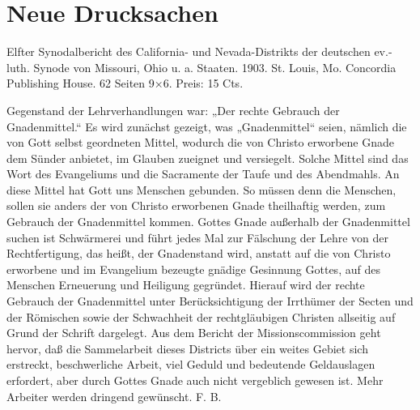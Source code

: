 \chapter{Neue Drucksachen}

Elfter Synodalbericht des California- und Nevada-Distrikts der deutschen ev.-luth. Synode von Missouri, Ohio u. a. Staaten. 1903. St. Louis, Mo. Concordia Publishing House. 62 Seiten 9×6. Preis: 15 Cts.

Gegenstand der Lehrverhandlungen war: „Der rechte Gebrauch der Gnadenmittel.“ Es wird zunächst gezeigt, was „Gnadenmittel“ seien, nämlich die von Gott selbst geordneten Mittel, wodurch die von Christo erworbene Gnade dem Sünder anbietet, im Glauben zueignet und versiegelt. Solche Mittel sind das Wort des Evangeliums und die Sacramente der Taufe und des Abendmahls. An diese Mittel hat Gott uns Menschen gebunden. So müssen denn die Menschen, sollen sie anders der von Christo erworbenen Gnade theilhaftig werden, zum Gebrauch der Gnadenmittel kommen. Gottes Gnade außerhalb der Gnadenmittel suchen ist Schwärmerei und führt jedes Mal zur Fälschung der Lehre von der Rechtfertigung, das heißt, der Gnadenstand wird, anstatt auf die von Christo erworbene und im Evangelium bezeugte gnädige Gesinnung Gottes, auf des Menschen Erneuerung und Heiligung gegründet. Hierauf wird der rechte Gebrauch der Gnadenmittel unter Berücksichtigung der Irrthümer der Secten und der Römischen sowie der Schwachheit der rechtgläubigen Christen allseitig auf Grund der Schrift dargelegt. Aus dem Bericht der Missionscommission geht hervor, daß die Sammelarbeit dieses Districts über ein weites Gebiet sich erstreckt, beschwerliche Arbeit, viel Geduld und bedeutende Geldauslagen erfordert, aber durch Gottes Gnade auch nicht vergeblich gewesen ist. Mehr Arbeiter werden dringend gewünscht. F. B.
